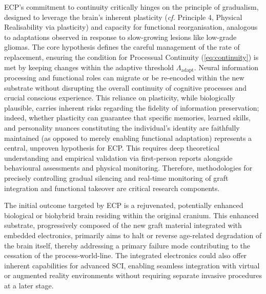 \documentclass[10pt]{article}
\begin{document}
\begin{sloppypar}
  ECP’s commitment to continuity critically hinges on the principle of gradualism, designed to leverage the brain’s inherent plasticity (\textit{cf.} Principle 4, Physical Realisability via plasticity) and capacity for functional reorganisation, analogous to adaptations observed in response to slow-growing lesions like low-grade gliomas. The core hypothesis defines the careful management of the rate of replacement, ensuring the condition for Processual Continuity (\autoref{eq:continuity}) is met by keeping changes within the adaptive threshold \( \Lambda_{\text{adapt}} \). Neural information processing and functional roles can migrate or be re-encoded within the new substrate without disrupting the overall continuity of cognitive processes and crucial conscious experience. This reliance on plasticity, while biologically plausible, carries inherent risks regarding the fidelity of information preservation; indeed, whether plasticity can guarantee that specific memories, learned skills, and personality nuances constituting the individual’s identity are faithfully maintained (as opposed to merely enabling functional adaptation) represents a central, unproven hypothesis for ECP. This requires deep theoretical understanding and empirical validation via first-person reports alongside behavioural assessments and physical monitoring. Therefore, methodologies for precisely controlling gradual silencing and real-time monitoring of graft integration and functional takeover are critical research components.

  The initial outcome targeted by ECP is a rejuvenated, potentially enhanced biological or biohybrid brain residing within the original cranium. This enhanced substrate, progressively composed of the new graft material integrated with embedded electronics, primarily aims to halt or reverse age-related degradation of the brain itself, thereby addressing a primary failure mode contributing to the cessation of the process-world-line. The integrated electronics could also offer inherent capabilities for advanced SCI, enabling seamless integration with virtual or augmented reality environments without requiring separate invasive procedures at a later stage.


\end{sloppypar}
\end{document}

